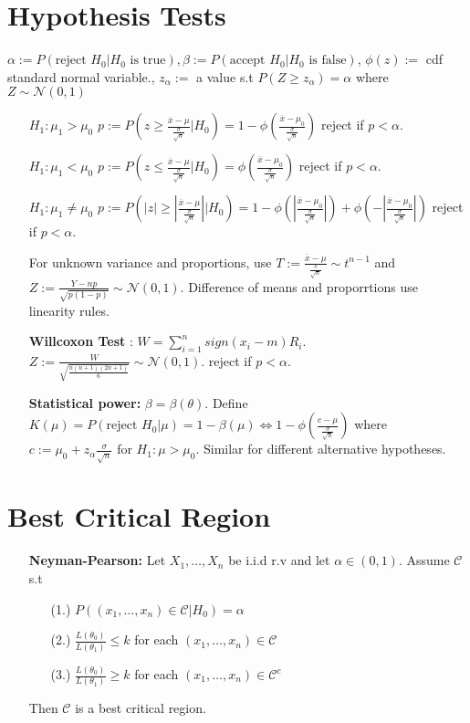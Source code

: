 \documentclass[10pt]{article}
\begin{document}
\section{Hypothesis Tests}
$\alpha:=P(\text{reject }H_0|H_0\text{ is true}),\beta:=P(\text{accept }H_0|H_0\text{ is false})$, $\phi(z):=$ cdf standard normal variable., $z_\alpha:=$ a value s.t $P(Z\ge z_\alpha)=\alpha$ where $Z\sim\mathcal{N}(0,1)$
\begin{itemize}
    \item [$H_1:\mu_1>\mu_0$] $p:=P(z\ge\frac{\overline{x}-\mu}{\frac{\sigma}{\sqrt{n}}}|H_0)=1-\phi(\frac{\overline{x}-\mu_0}{\frac{\sigma}{\sqrt{n}}})$ reject if $p<\alpha$.
    \item [$H_1:\mu_1<\mu_0$] $p:=P(z\le\frac{\overline{x}-\mu}{\frac{\sigma}{\sqrt{n}}}|H_0)=\phi(\frac{\overline{x}-\mu_0}{\frac{\sigma}{\sqrt{n}}})$ reject if $p<\alpha$. 
    \item [$H_1:\mu_1\neq\mu_0$] $p:=P(|z|\ge|\frac{\overline{x}-\mu}{\frac{\sigma}{\sqrt{n}}}||H_0)=1-\phi(|\frac{\overline{x}-\mu_0}{\frac{\sigma}{\sqrt{n}}}|)+\phi(-|\frac{\overline{x}-\mu_0}{\frac{\sigma}{\sqrt{n}}}|)$ reject if $p<\alpha$.
    \item [] For unknown variance and proportions, use $T:=\frac{\overline{x}-\mu}{\frac{s}{\sqrt{n}}}\sim t^{n-1}$ and $Z:=\frac{Y-np}{\sqrt{p(1-p)}}\sim \mathcal{N}(0,1)$. Difference of means and proporrtions use linearity rules.
    \item [\bf Willcoxon Test]: $W=\sum_{i=1}^{n}sign(x_i-m)R_i$. $Z:=\frac{W}{\sqrt{\frac{n(n+1)(2n+1)}{6}}}\sim\mathcal{N}(0,1)$. reject if $p<\alpha$.
    \item [\bf Statistical power:] $\beta=\beta(\theta)$. Define $K(\mu)=P(\text{reject }H_0|\mu)=1-\beta(\mu)\Leftrightarrow 1-\phi(\frac{c-\mu}{\frac{\sigma}{\sqrt{n}}})$ where $c:=\mu_0+z_\alpha\frac{\sigma}{\sqrt{n}}$ for $H_1:\mu>\mu_0$. Similar for different alternative hypotheses. 
\end{itemize}
\section{Best Critical Region}
\begin{itemize}
    \item [\bf Neyman-Pearson:] Let $X_1,\ldots,X_n$ be i.i.d r.v and let $\alpha\in(0,1)$. Assume $\mathcal{C}$ s.t \begin{itemize}
        \item [(1.)] $P((x_1,\ldots,x_n)\in\mathcal{C}|H_0)=\alpha$
        \item [(2.)] $\frac{L(\theta_0)}{L(\theta_1)}\le k$ for each $(x_1,\ldots,x_n)\in\mathcal{C}$
        \item [(3.)] $\frac{L(\theta_0)}{L(\theta_1)}\ge k$ for each $(x_1,\ldots,x_n)\in\mathcal{C}^c$
    \end{itemize} 
    Then $\mathcal{C}$ is a best critical region.
\end{itemize}
\end{document}
